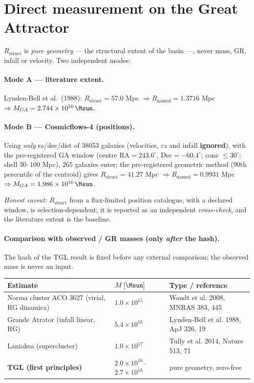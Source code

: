 \documentclass[11pt]{article}
\theoremstyle{definition}\newtheorem{deriv}{Derivation}
\begin{document}
\section{Direct measurement on the Great Attractor}

$R_{\mathrm{struct}}$ is \emph{pure geometry} --- the structural extent of the basin ---, never mass, GR, infall or velocity. Two independent modes:

\paragraph{Mode A --- literature extent.} Lynden-Bell et al.\ (1988): $R_{\mathrm{struct}}=57.0$ Mpc $\Rightarrow R_{\mathrm{named}}=1.3716$ Mpc $\Rightarrow M_{GA}=2.744\times10^{16}\,\Msun$.

\paragraph{Mode B --- Cosmicflows-4 (positions).} Using \emph{only} ra/dec/dist of 38053 galaxies (velocities, $cz$ and infall \textbf{ignored}), with the pre-registered GA window (centre $\mathrm{RA}=243.6^\circ$, $\mathrm{Dec}=-60.4^\circ$; cone $\leq30^\circ$; shell $30$--$100$ Mpc), $265$ galaxies enter; the pre-registered geometric method (90th percentile of the centroid) gives $R_{\mathrm{struct}}=41.27$ Mpc $\Rightarrow R_{\mathrm{named}}=0.9931$ Mpc $\Rightarrow M_{GA}=1.986\times10^{16}\,\Msun$.

\emph{Honest caveat:} $R_{\mathrm{struct}}$ from a flux-limited position catalogue, with a declared window, is selection-dependent; it is reported as an independent \emph{cross-check}, and the literature extent is the baseline.

\paragraph{Comparison with observed / GR masses (only \emph{after} the hash).} The hash of the TGL result is fixed before any external comparison; the observed mass is never an input.

\begin{center}\small\begin{tabular}{p{5.3cm}l p{5.2cm}}\toprule

Estimate & $M\,[\Msun]$ & Type / reference\\\midrule

Norma cluster ACO 3627 (virial, RG dinamica) & $1.0\times10^{15}$ & Woudt et al. 2008, MNRAS 383, 445\\

Grande Atrator (infall linear, RG) & $5.4\times10^{16}$ & Lynden-Bell et al. 1988, ApJ 326, 19\\

Laniakea (supercluster) & $1.0\times10^{17}$ & Tully et al. 2014, Nature 513, 71\\

\textbf{TGL (first principles)} & $2.0\times10^{16}$--$2.7\times10^{16}$ & pure geometry, zero-free\\\bottomrule

\end{tabular}\end{center}
\end{document}
